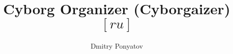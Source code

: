 


\newcommand{\bi}{\textcolor{blue}{Ы}}

\title{Cyborg Organizer (Cyborgaizer) $[ru]$}
\author{Dmitry Ponyatov }



\maketitle

\tableofcontents






